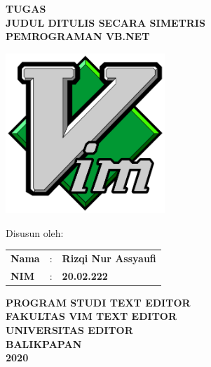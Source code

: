 \documentclass[oneside,listof=totoc]{scrbook}
\begin{document}
\frontmatter

\clearpage
\thispagestyle{empty}

\begin{center}
  \LARGE{\textbf{TUGAS}}\\
  \vspace{1.0cm}
  \Large{\textbf{JUDUL DITULIS SECARA SIMETRIS}}\\
  \Large{\textbf{PEMROGRAMAN VB.NET}}\\
\end{center}

\vspace{2.0cm}

\begin{minipage}{13cm}
  \centering
    \includegraphics[width=6cm]{figures/vim_logo}
\end{minipage}

\vspace{1.5cm}

\begin{center}
  \normalsize{Disusun oleh:}\\
  \vspace{0.5cm}
  \begin{minipage}{\textwidth}
    \begin{center}
      \begin{tabular}{l r l }
        \textbf{Nama}  & : & \textbf{Rizqi Nur Assyaufi}\\
        \textbf{NIM}   & : & \textbf{20.02.222}
      \end{tabular}
    \end{center}
  \end{minipage}
\end{center}

\vspace{2.0cm}

\begin{center}
  \large{\textbf{PROGRAM STUDI TEXT EDITOR}}\\
  \large{\textbf{FAKULTAS VIM TEXT EDITOR }}\\
  \large{\textbf{UNIVERSITAS EDITOR}}\\
  \large{\textbf{BALIKPAPAN}}\\
  \large{\textbf{2020}}
\end{center}
\end{document}

